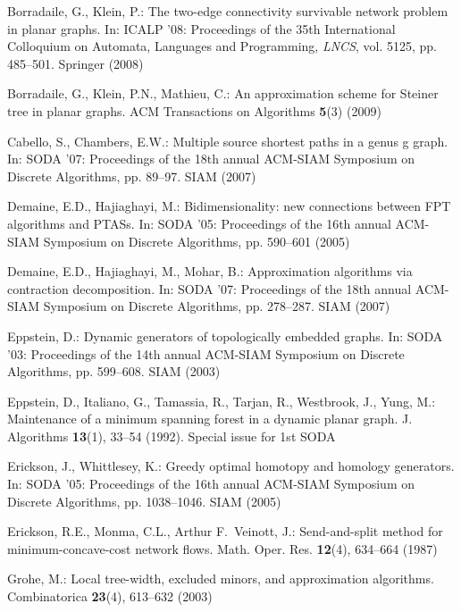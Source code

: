 \documentclass{article}
\begin{document}
\begin{center}
{\begin{minipage}[h]{0.95\linewidth}
\begin{thebibliography}{10}
Borradaile, G., Klein, P.: The two-edge connectivity survivable network problem
  in planar graphs.
\newblock In: ICALP '08: Proceedings of the 35th International Colloquium on
  Automata, Languages and Programming, \emph{LNCS}, vol. 5125, pp. 485--501.
  Springer (2008)

Borradaile, G., Klein, P.N., Mathieu, C.: An {} approximation
  scheme for {S}teiner tree in planar graphs.
\newblock ACM Transactions on Algorithms \textbf{5}(3) (2009)

Cabello, S., Chambers, E.W.: Multiple source shortest paths in a genus g graph.
\newblock In: SODA '07: Proceedings of the 18th annual ACM-SIAM Symposium on
  Discrete Algorithms, pp. 89--97. SIAM (2007)

Demaine, E.D., Hajiaghayi, M.: Bidimensionality: new connections between {FPT}
  algorithms and {PTASs}.
\newblock In: SODA '05: Proceedings of the 16th annual ACM-SIAM Symposium on
  Discrete Algorithms, pp. 590--601 (2005)

Demaine, E.D., Hajiaghayi, M., Mohar, B.: Approximation algorithms via
  contraction decomposition.
\newblock In: SODA '07: Proceedings of the 18th annual ACM-SIAM Symposium on
  Discrete Algorithms, pp. 278--287. SIAM (2007)

Eppstein, D.: Dynamic generators of topologically embedded graphs.
\newblock In: SODA '03: Proceedings of the 14th annual ACM-SIAM Symposium on
  Discrete Algorithms, pp. 599--608. SIAM (2003)

Eppstein, D., Italiano, G., Tamassia, R., Tarjan, R., Westbrook, J., Yung, M.:
  {Maintenance of a minimum spanning forest in a dynamic planar graph}.
\newblock J. Algorithms \textbf{13}(1), 33--54 (1992).
\newblock Special issue for 1st SODA

Erickson, J., Whittlesey, K.: Greedy optimal homotopy and homology generators.
\newblock In: SODA '05: Proceedings of the 16th annual ACM-SIAM Symposium on
  Discrete Algorithms, pp. 1038--1046. SIAM (2005)

Erickson, R.E., Monma, C.L., Arthur F.~Veinott, J.: Send-and-split method for
  minimum-concave-cost network flows.
\newblock Math. Oper. Res. \textbf{12}(4), 634--664 (1987)

Grohe, M.: Local tree-width, excluded minors, and approximation algorithms.
\newblock Combinatorica \textbf{23}(4), 613--632 (2003)


\end{thebibliography}
\end{minipage}}
\end{center}
\end{document}
